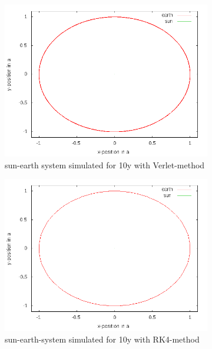 \documentclass[10pt,a4paper]{article}
\begin{document}
\begin{figure}[h]
\centering
\begin{subfigure}{0.45\textwidth}
\centering
	\includegraphics[width=\textwidth]{Verletposition_sun_earth.png}
	\caption{sun-earth system simulated for 10y with Verlet-method\label{TWOB_earth-sun-Verlet}}
\end{subfigure}
\begin{subfigure}{0.45\textwidth}
\centering
	\includegraphics[width=\textwidth]{Rungekuttaposition_sun_earth.png}
	\caption{sun-earth-system simulated for 10y with RK4-method \label{TWOB_earth-sun-RK4}}
\end{subfigure}
\begin{subfigure}{0.45\textwidth}

\end{subfigure}
\end{figure}
\end{document}
